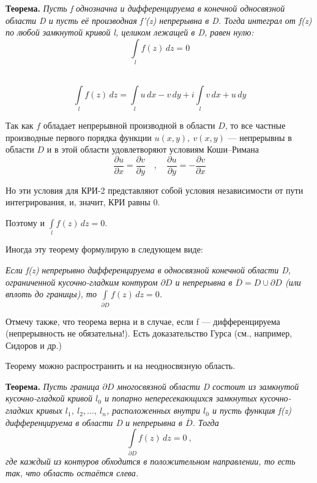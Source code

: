 \documentclass[a4paper, 12pt]{report}
\begin{document}
\textbf{Теорема.} \quad
\textit{Пусть f однозначна и дифференцируема в конечной односвязной области D и пусть её производная f'(z) непрерывна в D. Тогда интеграл от f(z) по любой замкнутой кривой l, целиком лежащей в D, равен нулю:}
$$\int\limits_l f(z)\,dz=0 $$\\
\blacklozenge \hspace{4 mm}
 \par
$$\int\limits_l f(z)\,dz = \int\limits_l u\,dx - v\,dy + i\int\limits_lv\,dx+u\,dy$$

Так как $f$ обладает непрерывной производной в области $D$, то все частные производные первого порядка функции $u(x,y),\ v(x,y)$ --- непрерывны в области $D$ и в этой области удовлетворяют условиям Коши--Римана
$$\frac{\partial u}{\partial x} = \frac{\partial v}{\partial y}\quad ,\quad \frac{\partial u}{\partial y} = - \frac{\partial v}{\partial x}$$

Но эти условия для КРИ-2 представляют собой условия независимости от пути интегрирования, и, значит, КРИ равны 0.

Поэтому и $\int\limits_l f(z)\,dz=0$. \quad
\blacksquare
\par\bigskip

Иногда эту теорему формулирую в следующем виде:
\par\bigskip
\textit{Если f(z) непрерывно дифференцируема в односвязной конечной области D, ограниченной кусочно-гладким контуром $\partial D$ и непрерывна в $\overline D = D \cup \partial D$ (или вплоть до границы), то $\int\limits_{\partial D} f(z)\, dz = 0$.}
\par\bigskip

Отмечу также, что теорема верна и в случае, если f --- дифференцируема (непрерывность не обязательна!). Есть доказательство Гурса (см., например, Сидоров и др.)

Теорему можно распространить и на неодносвязную область.
\par\bigskip

\textbf{Теорема.} \quad
\textit{Пусть граница $\partial D$ многосвязной области D состоит из замкнутой кусочно-гладкой кривой $l_0$ и попарно непересекающихся замкнутых кусочно-гладких кривых $l_1,\ l_2, \ldots ,\ l_n$, расположенных внутри $l_0$ и пусть функция f(z) дифференцируема в области D и непрерывна в $\overline D$. Тогда}
$$\int\limits_{\partial D} f(z)\,dz=0\ ,$$
\textit{где каждый из контуров обходится в положительном направлении, то есть так, что область остаётся слева.}\\
\end{document}
